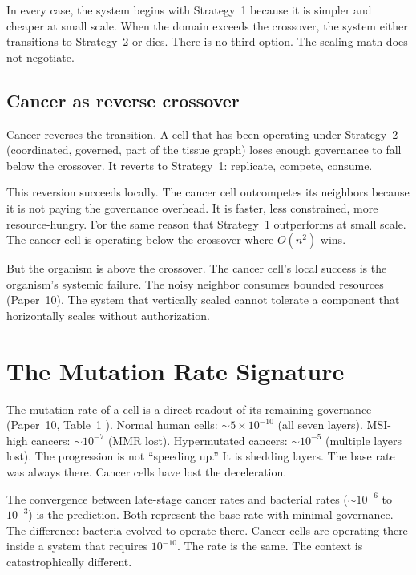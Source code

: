 \documentclass[11pt]{article}
\theoremstyle{definition}
\begin{document}
In every case, the system begins with Strategy~1 because it is
simpler and cheaper at small scale. When the domain exceeds the
crossover, the system either transitions to Strategy~2 or dies.
There is no third option. The scaling math does not negotiate.

\subsection{Cancer as reverse crossover}

Cancer reverses the transition. A cell that has been operating under
Strategy~2 (coordinated, governed, part of the tissue graph) loses
enough governance to fall below the crossover. It reverts to
Strategy~1: replicate, compete, consume.

This reversion succeeds locally. The cancer cell outcompetes its
neighbors because it is not paying the governance overhead. It is
faster, less constrained, more resource-hungry. For the same reason
that Strategy~1 outperforms at small scale. The cancer cell is
operating below the crossover where $O(n^2)$ wins.

But the organism is above the crossover. The cancer cell's local
success is the organism's systemic failure. The noisy neighbor
consumes bounded resources (Paper~10). The system that vertically
scaled cannot tolerate a component that horizontally scales
without authorization.

\section{The Mutation Rate Signature}
\label{sec:mutation-rate}

The mutation rate of a cell is a direct readout of its remaining
governance (Paper~10, Table~1 \cite{McCarthy2026j}). Normal human
cells: $\sim 5 \times 10^{-10}$ (all seven layers). MSI-high
cancers: $\sim 10^{-7}$ (MMR lost). Hypermutated cancers:
$\sim 10^{-5}$ (multiple layers lost). The progression is not
``speeding up.'' It is shedding layers. The base rate was always
there. Cancer cells have lost the deceleration.

The convergence between late-stage cancer rates and bacterial rates
($\sim 10^{-6}$ to $10^{-3}$) is the prediction. Both represent the
base rate with minimal governance. The difference: bacteria evolved
to operate there. Cancer cells are operating there inside a system
that requires $10^{-10}$. The rate is the same. The context is
catastrophically different.
\end{document}

